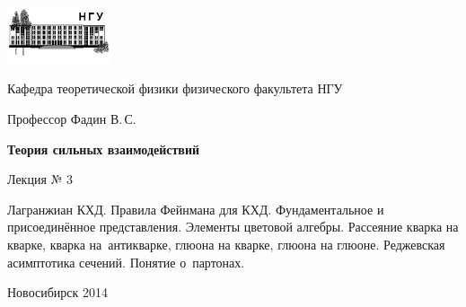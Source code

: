 \documentclass[12pt,pagesize,paper=192mm:108mm]{scrbook}
\begin{document}
\begin{titlepage}
  \vspace*{-1em}
  \begin{center}
    \includegraphics[width=0.23\textwidth]{../NSU-logo}

    Кафедра теоретической физики физического факультета НГУ
    \medskip

    \Large
    Профессор Фадин В.\,С.

    \huge
    \textbf{Теория сильных взаимодействий}
    \smallskip

    \Large
    Лекция № 3
    \vfill

    \normalsize
    \begin{minipage}{0.68\linewidth}
      Лагранжиан КХД. Правила Фейнмана для КХД. Фундаментальное и
      присоединённое представления. Элементы цветовой
      алгебры. Рассеяние кварка на кварке, кварка на~антикварке,
      глюона на кварке, глюона на глюоне. Реджевская асимптотика
      сечений. Понятие о~партонах.
    \end{minipage}
    \vfill

    \normalsize \ccbysa\hspace{0.5em} Новосибирск 2014
  \end{center}
\end{titlepage}
\end{document}
